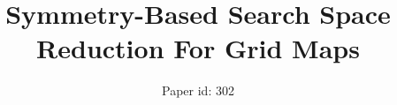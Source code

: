 \documentclass{article}
\begin{document}
\title{Symmetry-Based Search Space Reduction For Grid Maps}
\author{
Paper id: 302
}

\maketitle










%



\end{document}
